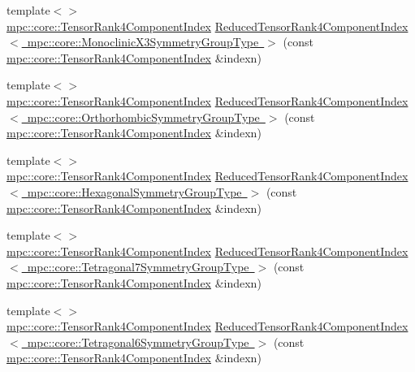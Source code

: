 \begin{DoxyCompactItemize}
\item 
{\footnotesize template$<$$>$ }\\\mbox{\hyperlink{namespacempc_1_1core_a54c081f41b2475abd10182bf023805d2}{mpc\+::core\+::\+Tensor\+Rank4\+Component\+Index}} \mbox{\hyperlink{namespacempc_1_1core_ad2c8e4dbec07c3685e0674acba76c636}{Reduced\+Tensor\+Rank4\+Component\+Index$<$ mpc\+::core\+::\+Monoclinic\+X3\+Symmetry\+Group\+Type $>$}} (const \mbox{\hyperlink{namespacempc_1_1core_a54c081f41b2475abd10182bf023805d2}{mpc\+::core\+::\+Tensor\+Rank4\+Component\+Index}} \&indexn)
\item 
{\footnotesize template$<$$>$ }\\\mbox{\hyperlink{namespacempc_1_1core_a54c081f41b2475abd10182bf023805d2}{mpc\+::core\+::\+Tensor\+Rank4\+Component\+Index}} \mbox{\hyperlink{namespacempc_1_1core_a846d4e3edf48bafd6214a87c038a9e65}{Reduced\+Tensor\+Rank4\+Component\+Index$<$ mpc\+::core\+::\+Orthorhombic\+Symmetry\+Group\+Type $>$}} (const \mbox{\hyperlink{namespacempc_1_1core_a54c081f41b2475abd10182bf023805d2}{mpc\+::core\+::\+Tensor\+Rank4\+Component\+Index}} \&indexn)
\item 
{\footnotesize template$<$$>$ }\\\mbox{\hyperlink{namespacempc_1_1core_a54c081f41b2475abd10182bf023805d2}{mpc\+::core\+::\+Tensor\+Rank4\+Component\+Index}} \mbox{\hyperlink{namespacempc_1_1core_a2b5f8439a02a650591d2bef22cff0705}{Reduced\+Tensor\+Rank4\+Component\+Index$<$ mpc\+::core\+::\+Hexagonal\+Symmetry\+Group\+Type $>$}} (const \mbox{\hyperlink{namespacempc_1_1core_a54c081f41b2475abd10182bf023805d2}{mpc\+::core\+::\+Tensor\+Rank4\+Component\+Index}} \&indexn)
\item 
{\footnotesize template$<$$>$ }\\\mbox{\hyperlink{namespacempc_1_1core_a54c081f41b2475abd10182bf023805d2}{mpc\+::core\+::\+Tensor\+Rank4\+Component\+Index}} \mbox{\hyperlink{namespacempc_1_1core_ae3728d6fa5c3d448761e8486bbbd596b}{Reduced\+Tensor\+Rank4\+Component\+Index$<$ mpc\+::core\+::\+Tetragonal7\+Symmetry\+Group\+Type $>$}} (const \mbox{\hyperlink{namespacempc_1_1core_a54c081f41b2475abd10182bf023805d2}{mpc\+::core\+::\+Tensor\+Rank4\+Component\+Index}} \&indexn)
\item 
{\footnotesize template$<$$>$ }\\\mbox{\hyperlink{namespacempc_1_1core_a54c081f41b2475abd10182bf023805d2}{mpc\+::core\+::\+Tensor\+Rank4\+Component\+Index}} \mbox{\hyperlink{namespacempc_1_1core_a8d91529fe189cafe00a575b601cf2b20}{Reduced\+Tensor\+Rank4\+Component\+Index$<$ mpc\+::core\+::\+Tetragonal6\+Symmetry\+Group\+Type $>$}} (const \mbox{\hyperlink{namespacempc_1_1core_a54c081f41b2475abd10182bf023805d2}{mpc\+::core\+::\+Tensor\+Rank4\+Component\+Index}} \&indexn)

\end{DoxyCompactItemize}
